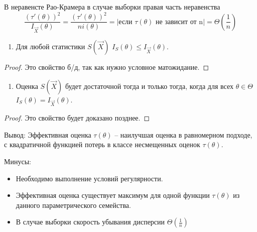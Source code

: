 \begin{consequence}
В неравенсте Рао-Крамера в случае выборки правая часть неравенства
\[
\frac{(\tau'(\theta))^2}{I_{\vec{X}}(\theta)} = \frac{(\tau'(\theta))^2}{ni(\theta)} = |\text{если } \tau(\theta) \text{ не зависит от n}| = \Theta(\frac{1}{n}) 
\]
\end{consequence}
\begin{enumerate}[resume]
	\item Для любой статистики $S(\vec{X})$ $I_{S}(\theta) \leq I_{\vec{X}}(\theta)$.
\end{enumerate}
\begin{proof}
	Это свойство б/д, так как нужно условное матожидание.
\end{proof}
\begin{enumerate}[resume]
	\item Оценка $S(\vec{X})$ будет достаточной тогда и только тогда, когда для всех $\theta \in \Theta$ $I_{S}(\theta) = I_{\vec{X}}(\theta)$.
\end{enumerate}
\begin{proof}
	Это свойство будет доказано позднее.
\end{proof}

Вывод: Эффективная оценка $\tau(\theta)$ -- наилучшая оценка в равномерном подходе, с квадратичной функцией потерь в классе несмещенных оценок $\tau(\theta)$.

Минусы:
\begin{itemize}
    \item Необходимо выполнение условий регулярности.
    \item Эффективная оценка существует максимум для одной функции $\tau(\theta)$ из данного параметрического семейства.
    \item В случае выборки скорость убывания дисперсии $\Theta(\frac{1}{n})$
\end{itemize}

